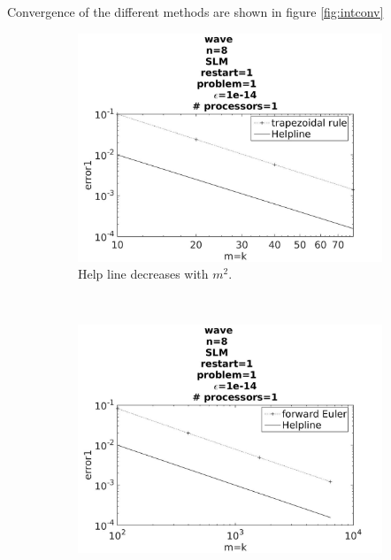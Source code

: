 Convergence of the different methods are shown in figure \ref{fig:intconv}

\begin{figure}[H]
        \centering
        \begin{subfigure}[b]{0.30\textwidth}
                \includegraphics[width=\textwidth]{../MATLAB/fig/intconvtrap.jpg}
                \caption{ Help line decreases with $m^2$. }
                \label{fig:intconvtrap}
        \end{subfigure}%
        ~
        \begin{subfigure}[b]{0.30\textwidth}
                \includegraphics[width=\textwidth]{../MATLAB/fig/intconveul.jpg}

\end{subfigure}
\end{figure}
